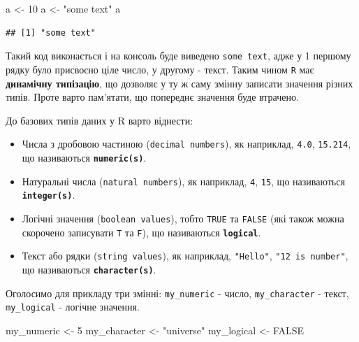 \documentclass[
]{book}
\newenvironment{Shaded}{\begin{snugshade}}{\end{snugshade}}
\newcommand{\ConstantTok}[1]{\textcolor[rgb]{0.00,0.00,0.00}{#1}}
\newcommand{\DecValTok}[1]{\textcolor[rgb]{0.00,0.00,0.81}{#1}}
\newcommand{\NormalTok}[1]{#1}
\newcommand{\OtherTok}[1]{\textcolor[rgb]{0.56,0.35,0.01}{#1}}
\newcommand{\StringTok}[1]{\textcolor[rgb]{0.31,0.60,0.02}{#1}}
\providecommand{\tightlist}{%
  \setlength{\itemsep}{0pt}\setlength{\parskip}{0pt}}
\begin{document}
\begin{Shaded}
\begin{Highlighting}[]
\NormalTok{a }\OtherTok{\textless{}{-}} \DecValTok{10}
\NormalTok{a }\OtherTok{\textless{}{-}} \StringTok{"some text"}
\NormalTok{a}
\end{Highlighting}
\end{Shaded}

\begin{verbatim}
## [1] "some text"
\end{verbatim}

Такий код виконається і на консоль буде виведено \texttt{some\ text}, адже у 1 першому рядку було присвоєно ціле число, у другому - текст. Таким чином \texttt{R} має \textbf{динамічну типізацію}, що дозволяє у ту ж саму змінну записати значення різних типів. Проте варто пам'ятати, що попереднє значення буде втрачено.

До базових типів даних у R варто віднести:

\begin{itemize}
\tightlist
\item
  Числа з дробовою частиною (\texttt{decimal\ numbers}), як наприклад, \texttt{4.0}, \texttt{15.214}, що називаються \textbf{\texttt{numeric(s)}}.
\item
  Натуральні числа (\texttt{natural\ numbers}), як наприклад, \texttt{4}, \texttt{15}, що називаються \textbf{\texttt{integer(s)}}.
\item
  Логічні значення (\texttt{boolean\ values}), тобто \texttt{TRUE} та \texttt{FALSE} (які також можна скорочено записувати \texttt{T} та \texttt{F}), що називаються \textbf{\texttt{logical}}.
\item
  Текст або рядки (\texttt{string\ values}), як наприклад, \texttt{"Hello"}, \texttt{"12\ is\ number"}, що називаються \textbf{\texttt{character(s)}}.
\end{itemize}

Оголосимо для прикладу три змінні: \texttt{my\_numeric} - число, \texttt{my\_character} - текст, \texttt{my\_logical} - логічне значення.

\begin{Shaded}
\begin{Highlighting}[]
\NormalTok{my\_numeric }\OtherTok{\textless{}{-}} \DecValTok{5}
\NormalTok{my\_character }\OtherTok{\textless{}{-}} \StringTok{"universe"}
\NormalTok{my\_logical }\OtherTok{\textless{}{-}} \ConstantTok{FALSE}
\end{Highlighting}
\end{Shaded}
\end{document}
